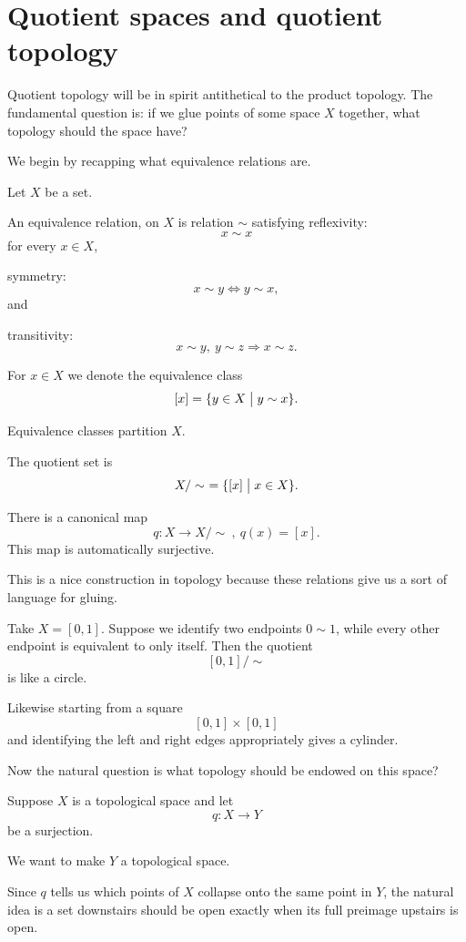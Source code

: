 \documentclass[11pt]{article}
\begin{document}
\section{Quotient spaces and quotient topology}

Quotient topology will be in spirit antithetical to 
the product topology. The fundamental question 
is: if we glue points of some space $X$ together, what 
topology should the space have? 

We begin by recapping what equivalence relations are. 

\begin{defn}
    Let $X$ be a set. 

    An equivalence relation, 
    on $X$ is relation $\sim$ satisfying reflexivity: 
    \[
        x \sim x
    \]
    for every $x\in X$, 
    
    symmetry: 
    \[
        x \sim y \Leftrightarrow y \sim x, 
    \]
    and 

    transitivity: 
    \[
        x \sim y, \ y \sim z \Rightarrow x \sim z. 
    \]

    For $x \in X$ we denote the equivalence class 
    \[
        [x] = \{y \in X \bigm| y \sim x\}. 
    \]
\end{defn}

Equivalence classes partition $X$. 

The quotient set is 
\[
    X/\sim \ = \{[x] \bigm| x \in X\}. 
\]

There is a canonical map 
\[
    q : X \to X/\sim \ , \ q(x) = [x].
\]
This map is automatically surjective. 

This is a nice construction in topology because 
these relations give us a sort of 
language for gluing. 

Take $X = [0,1]$. Suppose we identify two endpoints 
$0\sim 1$, while every other endpoint is 
equivalent to only itself. Then the quotient 
\[
    [0,1]/\sim
\]
is like a circle. 

Likewise starting from a square 
\[
    [0,1]\times [0,1]
\]
and identifying the left and right edges 
appropriately gives a cylinder. 

Now the natural question is what topology should be endowed 
on this space? 

Suppose $X$ is a topological space and let 
\[
    q : X \to Y
\]
be a surjection. 

We want to make $Y$ a topological space. 

Since $q$ tells us which points of $X$ collapse onto 
the same point in $Y$, the natural idea is 
a set downstairs should be open exactly when its 
full preimage upstairs is open. 
\end{document}
